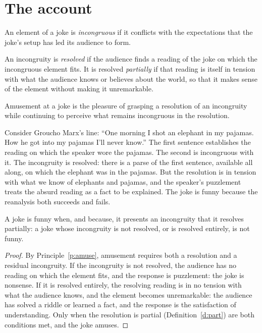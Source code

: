 \documentclass{situationist-preprint}
\begin{document}
\section{The account}

\begin{definition}[Incongruity]\label{d:inc}
An element of a joke is \emph{incongruous} if it conflicts with the expectations that the joke's setup has led its audience to form.
\end{definition}

\begin{definition}\label{d:part}
An incongruity is \emph{resolved} if the audience finds a reading of the joke on which the incongruous element fits. It is resolved \emph{partially} if that reading is itself in tension with what the audience knows or believes about the world, so that it makes sense of the element without making it unremarkable.
\end{definition}

\begin{principle}[Amusement]\label{p:amuse}
Amusement at a joke is the pleasure of grasping a resolution of an incongruity while continuing to perceive what remains incongruous in the resolution.
\end{principle}

Consider Groucho Marx's line: \enquote{One morning I shot an elephant in my pajamas. How he got into my pajamas I'll never know.} The first sentence establishes the reading on which the speaker wore the pajamas. The second is incongruous with it. The incongruity is resolved: there is a parse of the first sentence, available all along, on which the elephant was in the pajamas. But the resolution is in tension with what we know of elephants and pajamas, and the speaker's puzzlement treats the absurd reading as a fact to be explained. The joke is funny because the reanalysis both succeeds and fails.

\begin{theorem}\label{t:main}
A joke is funny when, and because, it presents an incongruity that it resolves partially: a joke whose incongruity is not resolved, or is resolved entirely, is not funny.
\end{theorem}

\begin{proof}
By Principle~\ref{p:amuse}, amusement requires both a resolution and a residual incongruity. If the incongruity is not resolved, the audience has no reading on which the element fits, and the response is puzzlement: the joke is nonsense. If it is resolved entirely, the resolving reading is in no tension with what the audience knows, and the element becomes unremarkable: the audience has solved a riddle or learned a fact, and the response is the satisfaction of understanding. Only when the resolution is partial (Definition~\ref{d:part}) are both conditions met, and the joke amuses.
\end{proof}
\end{document}
